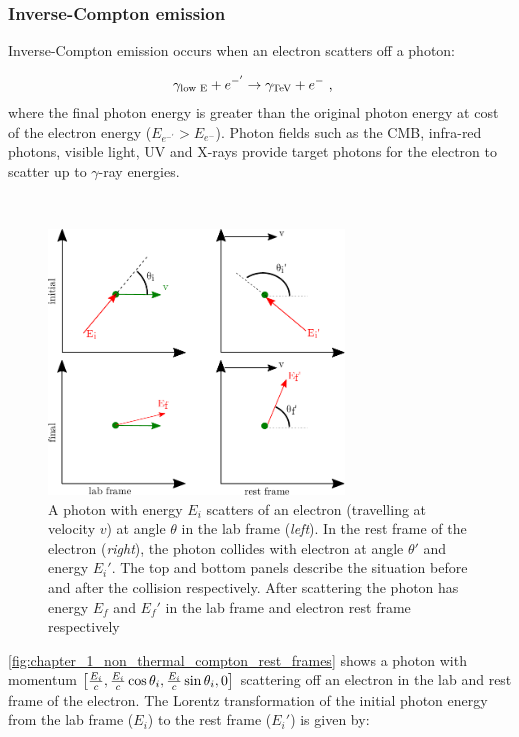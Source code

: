\subsubsection{Inverse-Compton emission}

Inverse-Compton emission occurs when an electron scatters off a photon:

\begin{align}
	\gamma_\text{low E} + e^{-'}&\rightarrow \gamma_{\TeV}+e^{-}\text{ ,}
\end{align}
where the final photon energy is greater than the original photon energy at cost of the electron energy ($E_{e^{-'}}>E_{e^-}$). Photon fields such as the CMB, infra-red photons, visible light, UV and X-rays provide target photons for the electron to scatter up to $\gamma$-ray energies. 
\par~\par
\begin{figure}[h!]
	\centering
	\includegraphics[width=0.7\textwidth]{04_Introduction/Images/non_thermal_emission/inverse_compton.pdf}
	\caption{A photon with energy $E_i$ scatters of an electron (travelling at velocity $v$) at angle $\theta$ in the lab frame (\textit{left}). In the rest frame of the electron (\textit{right}), the photon collides with electron at angle $\theta'$ and energy $E_i'$. The top and bottom panels describe the situation before and after the collision respectively. After scattering the photon has energy $E_f$ and $E_f'$ in the lab frame and electron rest frame respectively}
	\label{fig:chapter_1_non_thermal_compton_rest_frames}
\end{figure}
\autoref{fig:chapter_1_non_thermal_compton_rest_frames} shows a photon with momentum $\qty[\frac{E_i}{c},\frac{E_i}{c}\cos\theta_i,\frac{E_i}{c}\sin\theta_i,0]$ scattering off an electron in the lab and rest frame of the electron. The Lorentz transformation of the initial photon energy from the lab frame ($E_i$) to the rest frame ($E_i'$) is given by:

